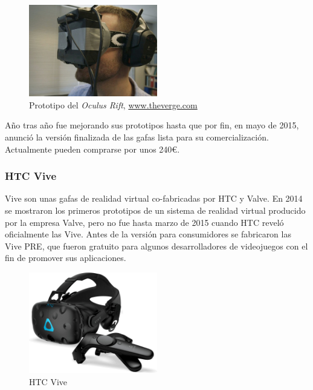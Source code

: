 \begin{figure}[!h]
\begin{center}
    \includegraphics[width=0.5\textwidth]{imagenes/2/oculus-prototipo.jpg}
    \caption{Prototipo del \textit{Oculus Rift}, \url{www.theverge.com}}
    \label{fig:oculus}
\end{center}
\end{figure}

Año tras año fue mejorando sus prototipos hasta que por fin, en mayo de 2015, anunció la versión finalizada de las gafas lista para su comercialización. Actualmente pueden comprarse por unos 240\euro.

\subsubsection{HTC Vive} 

Vive son unas gafas de realidad virtual co-fabricadas por HTC y Valve. En 2014 se mostraron los primeros prototipos de un sistema de realidad virtual producido por la empresa Valve, pero no fue hasta marzo de 2015 cuando HTC reveló oficialmente las Vive. Antes de la versión para consumidores se fabricaron las Vive PRE, que fueron gratuito para algunos desarrolladores de videojuegos con el fin de promover sus aplicaciones. 

\begin{figure}[!h]
\begin{center}
\includegraphics[width=0.5\textwidth]{imagenes/2/htc-vive.jpg}
\caption{HTC Vive}
\label{fig:htc-vive}
\end{center}
\end{figure}

